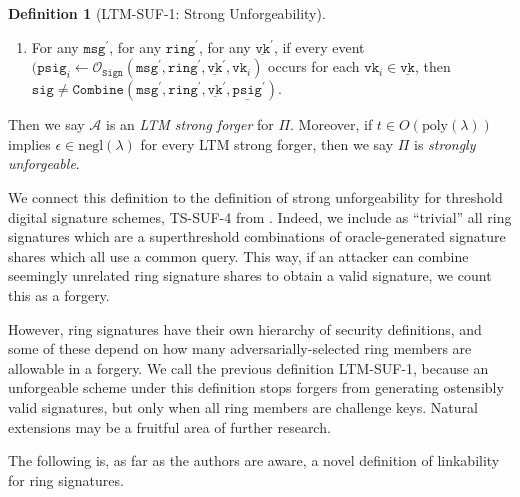 \documentclass[11pt]{article}
\theoremstyle{definition}
\newtheorem{definition}[definition]{Definition}
\newcommand{\vk}{\texttt{vk}}
\newcommand{\tvk}{\texttt{tvk}}
\newcommand{\ring}{\texttt{ring}}
\newcommand{\VK}{\underline{\texttt{vk}}}
\newcommand{\sig}{\texttt{sig}}
\newcommand{\psig}{\texttt{psig}}
\newcommand{\secpar}{\lambda}
\newcommand{\msg}{\texttt{msg}}
\newcommand{\sign}{\texttt{Sign}}
\newcommand{\combine}{\texttt{Combine}}
\newcommand{\PSIG}{\underline{\psig}}
\newcommand{\link}{\texttt{Link}}
\newcommand{\polysecpar}{O(\text{poly}(\secpar))}
\newcommand{\negl}{\text{negl}(\secpar)}
\newcommand{\signingOracle}{\mathcal{O}_{\sign}}
\newcommand{\corruptedTotalKeys}{\mathcal{L}_{\texttt{corrupt}}^{\texttt{tot}}}
\begin{document}
\begin{definition}[LTM-SUF-1: Strong Unforgeability]
\begin{enumerate}

\item For any $\msg^\prime$, for any $\ring^\prime$, for any $\VK^\prime$, if every event $(\psig_i \leftarrow \signingOracle(\msg^\prime, \ring^\prime, \VK^\prime, \vk_i)$ occurs for each  $\vk_i \in \VK$, then $\sig \neq \combine(\msg^\prime, \ring^\prime, \VK^\prime, \PSIG^\prime)$.
\end{enumerate}
Then we say $\mathcal{A}$ is an \textit{LTM strong forger} for $\Pi$. Moreover, if  $t \in \polysecpar$ implies $\epsilon \in \negl$ for every LTM strong forger, then we say $\Pi$ is \textit{strongly unforgeable}.
\end{definition}

We connect this definition to the definition of strong unforgeability for threshold digital signature schemes, TS-SUF-4 from \cite{bellare2022better}. Indeed, we include as ``trivial'' all ring signatures which are a superthreshold combinations of oracle-generated signature shares which all use a common query. This way, if an attacker can combine seemingly unrelated ring signature shares to obtain a valid signature, we count this as a forgery. 

However, ring signatures have their own hierarchy of security definitions, and some of these depend on how many adversarially-selected ring members are allowable in a forgery. We call the previous definition LTM-SUF-1, because an unforgeable scheme under this definition stops forgers from generating ostensibly valid signatures, but only when all ring members are challenge keys. Natural extensions may be a fruitful area of further research.


The following is, as far as the authors are aware, a novel definition of linkability for ring signatures.
\end{document}
